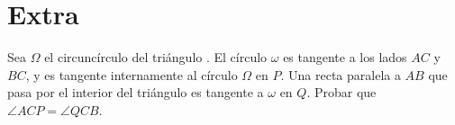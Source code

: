 \section{Extra}

\begin{section-problem}
    Sea $\Omega$ el circuncírculo del triángulo .
    El círculo $\omega$ es tangente a los lados $AC$ y $BC$, y es tangente internamente al círculo $\Omega$ en $P$.
    Una recta paralela a $AB$ que pasa por el interior del triángulo  es tangente a $\omega$ en $Q$.
    Probar que $\angle ACP = \angle QCB$.
\end{section-problem}